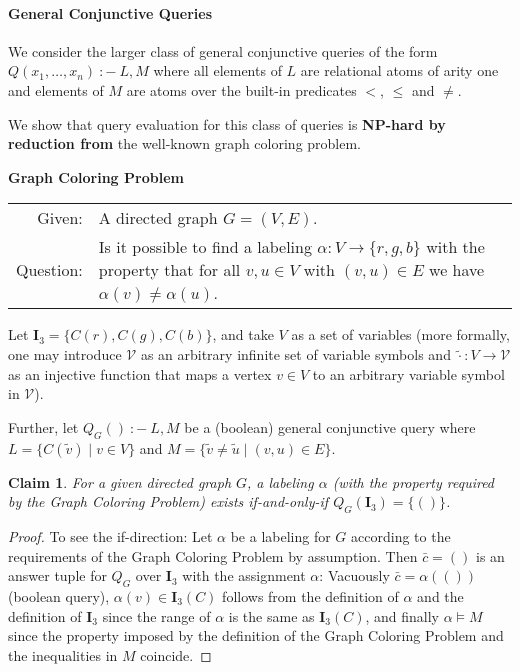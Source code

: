 \documentclass[a4paper,12pt]{article}
\newtheorem{claim}{Claim}
\newcommand{\dbi}{\ensuremath{\mathbf{I}}}
\newcommand{\query}[3]{\ensuremath{{#1}({#2})\:{:}{-}\:{#3}}}
\begin{document}
\paragraph{General Conjunctive Queries}{We consider the larger class of general conjunctive queries of the form $\query{Q}{x_1, \dots, x_n}{L,M}$ where all elements of $L$ are relational atoms of arity one and elements of $M$ are atoms over the built-in predicates $<$, $\leq$ and $\not =$.

We show that query evaluation for this class of queries is \textbf{NP-hard by reduction from} the well-known graph coloring problem.

\begin{center}
\textbf{Graph Coloring Problem}\\[1mm]
\begin{tabular}{rp{14cm}}
Given: & A directed graph $G = (V, E)$. \\
Question: & Is it possible to find a labeling $\alpha : V \rightarrow \{r, g, b\}$ with the property that for all $v, u \in V$ with $(v, u) \in E$ we have $\alpha(v) \not = \alpha(u)$.
\end{tabular}
\end{center}

Let $\dbi_{3} = \{ C(r), C(g), C(b) \}$, and take $V$ as a set of variables (more formally, one may introduce $\mathcal{V}$ as an arbitrary infinite set of variable symbols and $\tilde{\cdot} : V \rightarrow \mathcal{V}$ as an injective function that maps a vertex $v \in V$ to an arbitrary variable symbol in $\mathcal{V}$).

Further, let $\query{Q_G}{}{L,M}$ be a (boolean) general conjunctive query where $L = \{ C(\tilde{v}) \mid v \in V \}$ and $M = \{ \tilde{v} \not = \tilde{u} \mid (v, u) \in E\}$.

\begin{claim}
For a given directed graph $G$, a labeling $\alpha$ (with the property required by the Graph Coloring Problem) exists if-and-only-if $Q_G(\dbi_3) = \{ () \}$.
\end{claim}

\begin{proof}
To see the if-direction: Let $\alpha$ be a labeling for $G$ according to the requirements of the Graph Coloring Problem by assumption. Then $\bar{c} = ()$ is an answer tuple for $Q_G$ over $\dbi_3$ with the assignment $\alpha$: Vacuously $\bar{c} = \alpha(())$ (boolean query), $\alpha(v) \in \dbi_3(C)$ follows from the definition of $\alpha$ and the definition of $\dbi_3$ since the range of $\alpha$ is the same as $\dbi_3(C)$, and finally $\alpha \models M$ since the property imposed by the definition of the Graph Coloring Problem and the inequalities  in $M$ coincide.


\end{proof}}
\end{document}
